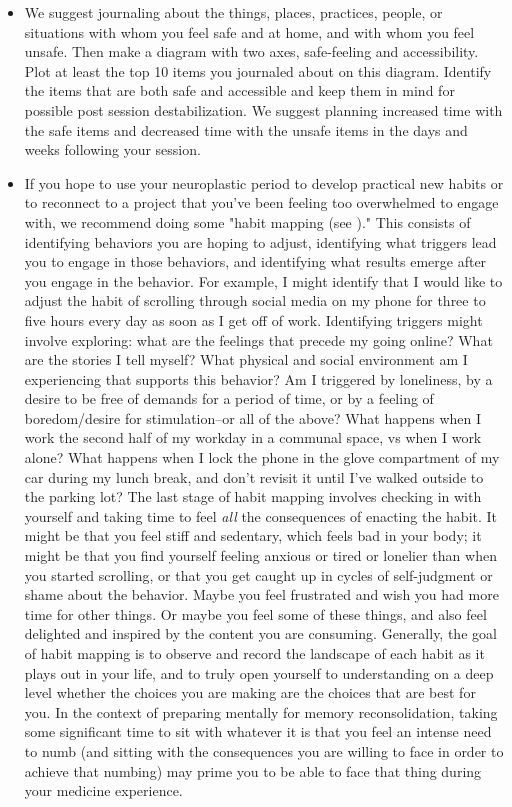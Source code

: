 \documentclass[12pt,letterpaper]{book}
\begin{document}
\begin{itemize}
    \label{safetymapping}
    \item We suggest journaling about the things, places, practices, people, or situations with whom you feel safe and at home, and with whom you feel unsafe. Then make a diagram with two axes, safe-feeling and accessibility. Plot at least the top 10 items you journaled about on this diagram. Identify the items that are both safe and accessible and keep them in mind for possible post session destabilization. We suggest planning increased time with the safe items and decreased time with the unsafe items in the days and weeks following your session.
    \label{habitMapping}
    \item {} If you hope to use your neuroplastic period to develop practical new habits or to reconnect to a project that you've been feeling too overwhelmed to engage with, we recommend doing some "habit mapping (see \textcite{habitMapping})." This consists of identifying behaviors you are hoping to adjust, identifying what triggers lead you to engage in those behaviors, and identifying what results emerge after you engage in the behavior. For example, I might identify that I would like to adjust the habit of scrolling through social media on my phone for three to five hours every day as soon as I get off of work. Identifying triggers might involve exploring: what are the feelings that precede my going online? What are the stories I tell myself? What physical and social environment am I experiencing that supports this behavior? Am I triggered by loneliness, by a desire to be free of demands for a period of time, or by a feeling of boredom/desire for stimulation–or all of the above? What happens when I work the second half of my workday in a communal space, vs when I work alone? What happens when I lock the phone in the glove compartment of my car during my lunch break, and don't revisit it until I've walked outside to the parking lot? The last stage of habit mapping involves checking in with yourself and taking time to feel \textit{all} the consequences of enacting the habit. It might be that you feel stiff and sedentary, which feels bad in your body; it might be that you find yourself feeling anxious or tired or lonelier than when you started scrolling, or that you get caught up in cycles of self-judgment or shame about the behavior. Maybe you feel frustrated and wish you had more time for other things. Or maybe you feel some of these things, and also feel delighted and inspired by the content you are consuming. Generally, the goal of habit mapping is to observe and record the landscape of each habit as it plays out in your life, and to truly open yourself to understanding on a deep level whether the choices you are making are the choices that are best for you. In the context of preparing mentally for memory reconsolidation, taking some significant time to sit with whatever it is that you feel an intense need to numb (and sitting with the consequences you are willing to face in order to achieve that numbing) may prime you to be able to face that thing during your medicine experience.

\end{itemize}
\end{document}
